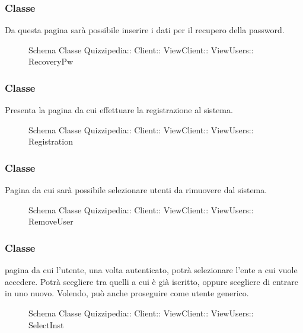 \subsubsection{Classe }
Da questa pagina sarà possibile inserire i dati per il recupero della password.
\begin{figure}[H]
\centering
\noindent{}
\caption[Schema Classe RecoveryPw]{Schema Classe Quizzipedia:: Client:: ViewClient:: ViewUsers:: RecoveryPw}
\end{figure}
\subsubsection{Classe }
Presenta la pagina da cui effettuare la  registrazione al sistema.
\begin{figure}[H]
\centering
\noindent{}
\caption[Schema Classe Registration]{Schema Classe Quizzipedia:: Client:: ViewClient:: ViewUsers:: Registration}
\end{figure}
\subsubsection{Classe }
Pagina da cui sarà possibile selezionare utenti da rimuovere dal sistema.
\begin{figure}[H]
\centering
\noindent{}
\caption[Schema Classe RemoveUser]{Schema Classe Quizzipedia:: Client:: ViewClient:: ViewUsers:: RemoveUser}
\end{figure}
\subsubsection{Classe }
pagina da cui l'utente, una volta autenticato, potrà selezionare l'ente a cui vuole accedere. Potrà scegliere tra quelli a cui è già iscritto, oppure scegliere di entrare in uno nuovo. Volendo, può anche proseguire come utente generico.
\begin{figure}[H]
\centering
\noindent{}
\caption[Schema Classe SelectInst]{Schema Classe Quizzipedia:: Client:: ViewClient:: ViewUsers:: SelectInst}
\end{figure}
